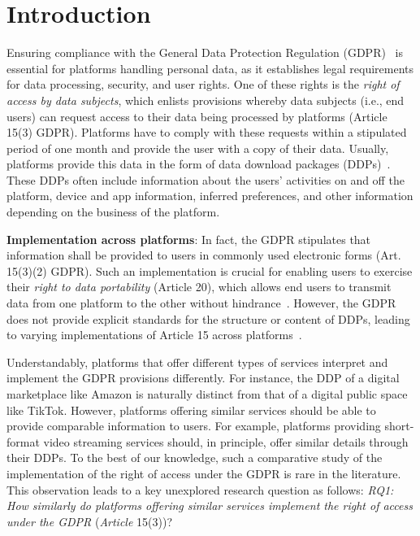 \section{Introduction} \label{Sec: Intro}
Ensuring compliance with the General Data Protection Regulation (GDPR)~\cite{EU2016GDPR} is essential for platforms handling personal data, as it establishes legal requirements for data processing, security, and user rights.
One of these rights is the \textit{right of access by data subjects}, which enlists provisions whereby data subjects (i.e., end users) can request access to their data being processed by platforms (Article 15(3) GDPR).
Platforms have to comply with these requests within a stipulated period of one month and provide the user with a copy of their data.
Usually, platforms provide this data in the form of data download packages (DDPs)~\cite{valkenburg2024time}.
These DDPs often include information about the users’ activities on and off the platform, device and app information, inferred preferences, and other information depending on the business of the platform.

\noindent
\textbf{Implementation across platforms}: In fact, the GDPR stipulates that information shall be provided to users in commonly used electronic forms (Art. 15(3)(2) GDPR).  
Such an implementation is crucial for enabling users to exercise their \textit{right to data portability} (Article 20), which allows end users to transmit data from one platform to the other without hindrance~\cite{EU2016GDPR}.
However, the GDPR does not provide explicit standards for the structure or content of DDPs, leading to varying implementations of Article 15 across platforms~\cite{borem2024data}.

Understandably, platforms that offer different types of services interpret and implement the GDPR provisions differently.
For instance, the DDP of a digital marketplace like Amazon is naturally distinct from that of a digital public space like TikTok. 
However, platforms offering similar services should be able to provide comparable information to users. 
For example, platforms providing short-format video streaming services should, in principle, offer similar details through their DDPs. 
To the best of our knowledge, such a comparative study of the implementation of the right of access under the GDPR is rare in the literature. 
This observation leads to a key unexplored research question as follows: \textit{RQ1: How similarly do platforms offering similar services implement the right of access under the GDPR} (\textit{Article} 15(3))?


